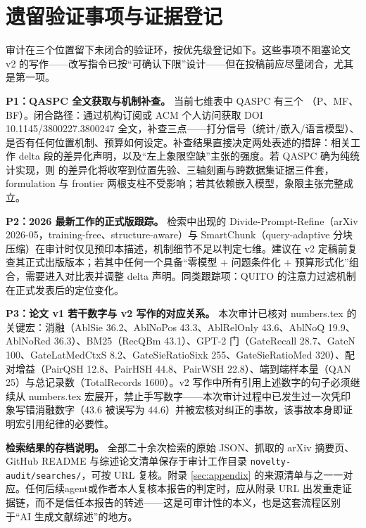 \section{遗留验证事项与证据登记}
\label{sec:pending}

审计在三个位置留下未闭合的验证环，按优先级登记如下。这些事项不阻塞论文 v2 的写作——改写指令已按``可确认下限''设计——但在投稿前应尽量闭合，尤其是第一项。

\textbf{P1：QASPC 全文获取与机制补查。}
当前七维表中 QASPC 有三个 \unk{}（P、MF、BF）。闭合路径：通过机构订阅或 ACM 个人访问获取 DOI 10.1145/3800227.3800247 全文，补查三点——打分信号（统计/嵌入/语言模型）、是否有任何位置机制、预算如何设定。补查结果直接决定两处表述的措辞：相关工作 delta 段的差异化声明，以及``左上象限空缺''主张的强度。若 QASPC 确为纯统计实现，则 \sieve{} 的差异化将收窄到位置先验、三轴刻画与跨数据集证据三件套，formulation 与 frontier 两根支柱不受影响；若其依赖嵌入模型，象限主张完整成立。

\textbf{P2：2026 最新工作的正式版跟踪。}
检索中出现的 Divide-Prompt-Refine（arXiv 2026-05，training-free、structure-aware）与 SmartChunk（query-adaptive 分块压缩）在审计时仅见预印本描述，机制细节不足以判定七维。建议在 v2 定稿前复查其正式出版版本；若其中任何一个具备``零模型 + 问题条件化 + 预算形式化''组合，需要进入对比表并调整 delta 声明。同类跟踪项：QUITO 的注意力过滤机制在正式发表后的定位变化。

\textbf{P3：论文 v1 若干数字与 v2 写作的对应关系。}
本次审计已核对 numbers.tex 的关键宏：消融（AblSie 36.2、AblNoPos 43.3、AblRelOnly 43.6、AblNoQ 19.9、AblNoRed 36.3）、BM25（RecQBm 43.1）、GPT-2 门（GateRecall 28.7、GateN 100、GateLatMedCtxS 8.2、GateSieRatioSixk 255、GateSieRatioMed 320）、配对增益（PairQSH 12.8、PairHSH 44.8、PairWSH 22.8）、端到端样本量（QAN 25）与总记录数（TotalRecords 1600）。v2 写作中所有引用上述数字的句子必须继续从 numbers.tex 宏展开，禁止手写数字——本次审计过程中已发生过一次凭印象写错消融数字（43.6 被误写为 44.6）并被宏核对纠正的事故，该事故本身即证明宏引用纪律的必要性。

\textbf{检索结果的存档说明。}
全部二十余次检索的原始 JSON、抓取的 arXiv 摘要页、GitHub README 与综述论文清单保存于审计工作目录 \texttt{novelty-audit/searches/}，可按 URL 复核。附录 \ref{sec:appendix} 的来源清单与之一一对应。任何后续agent或作者本人复核本报告的判定时，应从附录 URL 出发重走证据链，而不是信任本报告的转述——这是可审计性的本义，也是这套流程区别于``AI 生成文献综述''的地方。
